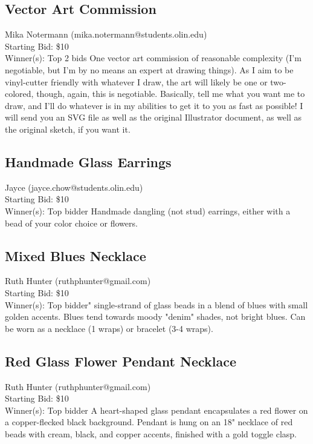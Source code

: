 \documentclass[11pt]{article}
\begin{document}
\subsection{Vector Art Commission}
Mika Notermann (mika.notermann@students.olin.edu) \\
Starting Bid: \$10 \\
Winner(s): 
Top 2 bids\newline
One vector art commission of reasonable complexity (I'm negotiable, but I'm by no means an expert at drawing things). As I aim to be vinyl-cutter friendly with whatever I draw, the art will likely be one or two-colored, though, again, this is negotiable. Basically, tell me what you want me to draw, and I'll do whatever is in my abilities to get it to you as fast as possible! I will send you an SVG file as well as the original Illustrator document, as well as the original sketch, if you want it.
\subsection{Handmade Glass Earrings}
Jayce (jayce.chow@students.olin.edu) \\
Starting Bid: \$10 \\
Winner(s): 
Top bidder\newline
Handmade dangling (not stud) earrings, either with a bead of your color choice or flowers.
\subsection{Mixed Blues Necklace}
Ruth Hunter (ruthphunter@gmail.com) \\
Starting Bid: \$10 \\
Winner(s): 
Top bidder" single-strand of glass beads in a blend of blues with small golden accents. Blues tend towards moody "denim" shades, not bright blues.  Can be worn as a necklace (1 wraps) or bracelet (3-4 wraps).
\subsection{Red Glass Flower Pendant Necklace}
Ruth Hunter (ruthphunter@gmail.com) \\
Starting Bid: \$10 \\
Winner(s): 
Top bidder\newline
A heart-shaped glass pendant encapsulates a red flower on a copper-flecked black background.  Pendant is hung on an 18" necklace of red beads with cream, black, and copper accents, finished with a gold toggle clasp.
\end{document}
